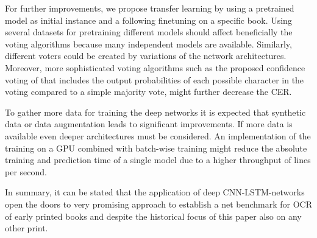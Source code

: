 \documentclass{jlcl}
\begin{document}
For further improvements, we propose transfer learning by using a pretrained model as initial instance and a following finetuning on a specific book.
Using several datasets for pretraining different models should affect beneficially the voting algorithms because many independent models are available.
Similarly, different voters could be created by variations of the network architectures.
Moreover, more sophisticated voting algorithms such as the proposed confidence voting of \cite{reul2017voting} that includes the output probabilities of each possible character in the voting compared to a simple majority vote, might further decrease the CER.

To gather more data for training the deep networks it is expected that synthetic data or data augmentation leads to significant improvements.
If more data is available even deeper architectures must be considered.
An implementation of the training on a GPU combined with batch-wise training might reduce the absolute training and prediction time of a single model due to a higher throughput of lines per second.


In summary, it can be stated that the application of deep CNN-LSTM-networks open the doors to very promising approach to establish a net benchmark for OCR of early printed books and despite the historical focus of this paper also on any other print.

{\small }
\end{document}
